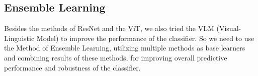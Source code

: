 \subsection{Ensemble Learning}
Besides the methods of ResNet and the ViT, we also tried the VLM (Visual-Linguistic Model) to improve the performance of the classifier. So we need to use the Method of Ensemble Learning, utilizing multiple methods as base learners and combining results of these methods, for improving overall predictive performance and robustness of the classifier.



